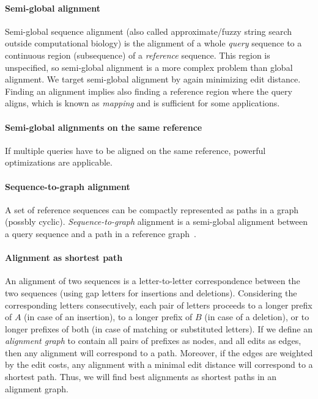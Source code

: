 \paragraph{Semi-global alignment}
Semi-global sequence alignment (also called approximate/fuzzy string search
outside computational biology) is the alignment of a whole \emph{query} sequence
to a continuous region (subsequence) of a \emph{reference} sequence. This region
is unspecified, so semi-global alignment is a more complex problem than global
alignment. We target semi-global alignment by again minimizing edit distance.
Finding an alignment implies also finding a reference region where the query
aligns, which is known as \emph{mapping} and is sufficient for some
applications.

\paragraph{Semi-global alignments on the same reference}
If multiple queries have to be aligned on the same reference, powerful
optimizations are applicable.

\paragraph{Sequence-to-graph alignment}
A set of reference sequences can be compactly represented as paths in a graph
(possbly cyclic). \emph{Sequence-to-graph} alignment is a semi-global alignment
between a query sequence and a path in a reference
graph~\cite{jain_complexity_2019}.

\paragraph{Alignment as shortest path}
An alignment of two sequences is a letter-to-letter correspondence between the
two sequences (using gap letters for insertions and deletions). Considering the
corresponding letters consecutively, each pair of letters proceeds to a longer
prefix of $A$ (in case of an insertion), to a longer prefix of $B$ (in case of a
deletion), or to longer prefixes of both (in case of matching or substituted
letters). If we define an \emph{alignment graph} to contain all pairs of
prefixes as nodes, and all edits as edges, then any alignment will correspond to
a path. Moreover, if the edges are weighted by the edit costs, any alignment
with a minimal edit distance will correspond to a shortest path. Thus, we will
find best alignments as shortest paths in an alignment graph.

